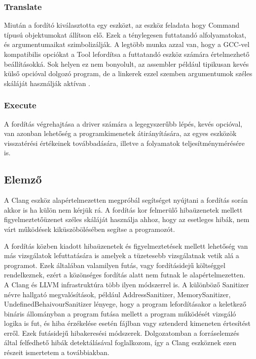 \documentclass[a4paper,12pt]{report}
\begin{document}
\subsubsection{Translate}
Miután a fordító kiválasztotta egy eszközt, az eszköz feladata hogy Command típusú objektumokat állítson elő. Ezek a ténylegesen futtatandó alfolyamatokat, és argumentumaikat szimbolizálják. A legtöbb munka azzal van, hogy a GCC-vel kompatibilis opciókat a Tool lefordítsa a futtatandó eszköz számára értelmezhető beállításokká. Sok helyen ez nem bonyolult, az assembler például tipikusan kevés külső opcióval dolgozó program, de a linkerek ezzel szemben argumentumok széles skáláját használják aktívan \cite{clangdriverinternals}.

\subsubsection{Execute}
A fordítás végrehajtása a driver számára a legegyszerűbb lépés, kevés opcióval, van azonban lehetőség a programkimenetek átirányítására, az egyes eszközök visszatérési értékeinek továbbadására, illetve a folyamatok teljesítménymérésére is.

\subsection{Elemző}
A Clang eszköz alapértelmezetten megpróbál segítséget nyújtani a fordítás során akkor is ha külön nem kérjük rá. A fordítás kor felmerülő hibaüzenetek mellett figyelmeztetőüzenet széles skáláját használja ahhoz, hogy az esetleges hibák, nem várt működések kiküszöbölésében segítse a programozót.

A fordítás közben kiadott hibaüzenetek és figyelmeztetések mellett lehetőség van más vizsgálatok lefuttatására is amelyek a tüzetesebb vizsgálatnak vetik alá a programot. Ezek általában valamilyen futás, vagy fordításidejű költséggel rendelkeznek, ezért a közönséges fordítás alatt nem futnak le alapértelmezetten.
A Clang és LLVM infrastruktúra több ilyen módszerrel is. A különböző Sanitizer névre hallgató megvalósítások, például AddressSanitizer, MemorySanitizer, UndefinedBehaivourSanitizer lényege, hogy a program lefordításakor a keletkező bináris állományban a program futása mellett a program működését vizsgáló logika is fut, és hiba érzékelése esetén fájlban vagy sztenderd kimeneten értesítést erről. Ezek futásidejű hibakeresési módszerek. Dolgozatomban a forráselemzés által felfedhető hibák detektálásával foglalkozom, így a Clang eszköznek ezen részeit ismertetem a továbbiakban.
\end{document}
